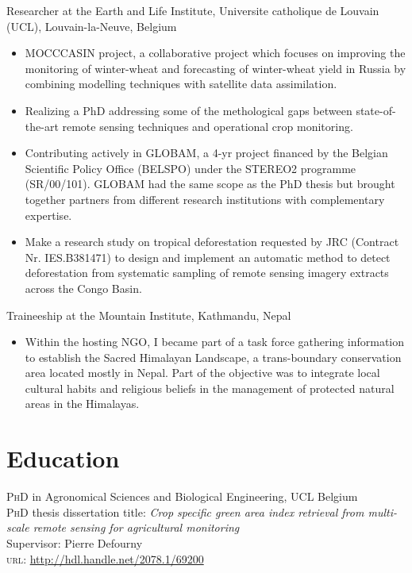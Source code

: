 \documentclass[11pt, a4paper]{article} %
\newcommand{\years}[1]{\marginnote{\scriptsize #1}} %
\begin{document}
\years{01/2006-01/2011} Researcher at the Earth and Life Institute, Universite catholique de Louvain (UCL), Louvain-la-Neuve, Belgium
\begin{itemize}
\item MOCCCASIN project, a collaborative project which focuses on improving the monitoring of winter-wheat and forecasting of winter-wheat yield in Russia by combining modelling techniques with satellite data assimilation.
\item Realizing a PhD addressing some of the methological gaps between state-of-the-art remote sensing techniques and operational crop monitoring.
\item Contributing actively in GLOBAM, a 4-yr project financed by the Belgian Scientific Policy Office (BELSPO) under the STEREO2 programme (SR/00/101). GLOBAM had the same scope as the PhD thesis but brought together partners from different research institutions with complementary expertise.
\item Make a research study on tropical deforestation requested by JRC (Contract Nr. IES.B381471) to design and implement an automatic method to detect deforestation from systematic sampling of remote sensing imagery extracts across the Congo Basin.
\end{itemize}
\years{09/2005-12/2005} Traineeship at the Mountain Institute, Kathmandu, Nepal
\begin{itemize}
\item Within the hosting NGO, I became part of a task force gathering information to establish the Sacred Himalayan Landscape, a trans-boundary conservation area located mostly in Nepal. Part of the objective was to integrate local cultural habits and religious beliefs in the management of protected natural areas in the Himalayas.
\end{itemize}

\section*{Education}
\years{\raggedleft2011}\textsc{PhD} in Agronomical Sciences and Biological Engineering, UCL Belgium\\
\textsc{PhD} thesis dissertation title: \textit{Crop specific green area index retrieval from multi-scale remote sensing for agricultural monitoring}\\
Supervisor: Pierre Defourny\\
\textsc{url}: \url{http://hdl.handle.net/2078.1/69200}\\
\end{document}
